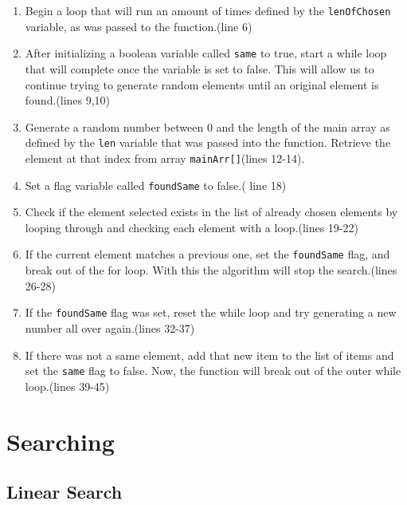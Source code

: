 \documentclass[letterpaper, 10pt]{article}
\begin{document}
\begin{enumerate}
    \item Begin a loop that will run an amount of times defined by the \texttt{lenOfChosen} variable, as was passed to the function.(line 6)
    \item After initializing a boolean variable called \texttt{same} to true, start a while loop that will complete once the variable is set to false. This will allow us to continue trying to generate random elements until an original element is found.(lines 9,10)
    \item Generate a random number between 0 and the length of the main array as defined by the \texttt{len} variable that was passed into the function. Retrieve the element at that index from array \texttt{mainArr[]}(lines 12-14).
    \item Set  a flag variable called \texttt{foundSame} to false.( line 18)
    \item Check if the element selected exists in the list of already chosen elements by looping through and checking each element with a loop.(lines 19-22)
    \item If the current element matches a previous one, set the \texttt{foundSame} flag, and break out of the for loop. With this the algorithm will stop the search.(lines 26-28)
    \item If the \texttt{foundSame} flag was set, reset the while loop and try generating a new number all over again.(lines 32-37)
    \item If there was not a same element, add that new item to the list of items and set the \texttt{same} flag to false. Now, the function will break out of the outer while loop.(lines 39-45)
\end{enumerate}


\section{Searching}

\subsection{Linear Search}
\end{document}
